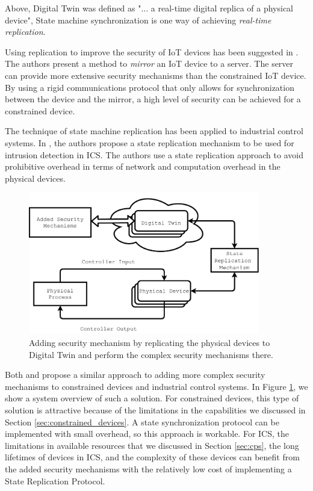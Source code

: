 Above, Digital Twin was defined as "... a real-time digital replica of a physical device", State machine synchronization is one way of achieving \emph{real-time replication}.

Using replication to improve the security of IoT devices has been suggested in \cite{gehrmann2016iot}. The authors present a method to \emph{mirror} an IoT device to a server. The server can provide more extensive security mechanisms than the constrained IoT device. By using a rigid communications protocol that only allows for synchronization between the device and the mirror, a high level of security can be achieved for a constrained device.

The technique of state machine replication has been applied to industrial control systems. In \cite{Eckhart2018}, the authors propose a state replication mechanism to be used for intrusion detection in ICS. The authors use a state replication approach to avoid prohibitive overhead in terms of network and computation overhead in the physical devices.

\begin{figure}[h]
\centering
\includegraphics[width=0.9\textwidth]{images/state_replication_security.pdf}
\caption{Adding security mechanism by replicating the physical devices to Digital Twin and perform the complex security mechanisms there.}
\label{fig:state-replication-sec}
\end{figure}

Both \cite{gehrmann2016iot} and \cite{Eckhart2018} propose a similar approach to adding more complex security mechanisms to constrained devices and industrial control systems. In Figure \ref{fig:state-replication-sec}, we show a system overview of such a solution. For constrained devices, this type of solution is attractive because of the limitations in the capabilities we discussed in Section \ref{sec:constrained_devices}. A state synchronization protocol can be implemented with small overhead, so this approach is workable. For ICS, the limitations in available resources that we discussed in Section \ref{sec:cps}, the long lifetimes of devices in ICS, and the complexity of these devices can benefit from the added security mechanisms with the relatively low cost of implementing a State Replication Protocol.

